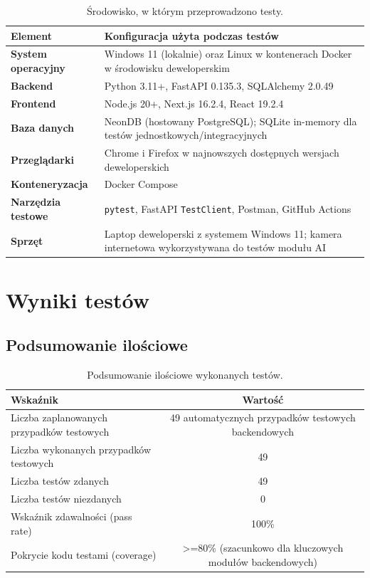 \documentclass[11pt,a4paper]{article}
\begin{document}
\begin{table}[h]
\centering
\begin{tabularx}{\textwidth}{>{\bfseries}p{3.5cm} Y}
\toprule
\textbf{Element} & \textbf{Konfiguracja użyta podczas testów} \\
\midrule
System operacyjny & Windows 11 (lokalnie) oraz Linux w kontenerach Docker w środowisku deweloperskim \\
Backend & Python 3.11+, FastAPI 0.135.3, SQLAlchemy 2.0.49 \\
Frontend & Node.js 20+, Next.js 16.2.4, React 19.2.4 \\
Baza danych & NeonDB (hostowany PostgreSQL); SQLite in-memory dla testów jednostkowych/integracyjnych \\
Przeglądarki & Chrome i Firefox w najnowszych dostępnych wersjach deweloperskich \\
Konteneryzacja & Docker Compose \\
Narzędzia testowe & \texttt{pytest}, FastAPI \texttt{TestClient}, Postman, GitHub Actions \\
Sprzęt & Laptop deweloperski z systemem Windows 11; kamera internetowa wykorzystywana do testów modułu AI \\
\bottomrule
\end{tabularx}
\caption{Środowisko, w którym przeprowadzono testy.}
\end{table}

\section{Wyniki testów}

\subsection{Podsumowanie ilościowe}
\begin{table}[h]
\centering
\begin{tabularx}{\textwidth}{Y c}
\toprule
\textbf{Wskaźnik} & \textbf{Wartość} \\
\midrule
Liczba zaplanowanych przypadków testowych & 49 automatycznych przypadków testowych backendowych \\
Liczba wykonanych przypadków testowych & 49 \\
Liczba testów zdanych & 49 \\
Liczba testów niezdanych & 0 \\
Wskaźnik zdawalności (pass rate) & 100\% \\
Pokrycie kodu testami (coverage) & \textgreater=80\% (szacunkowo dla kluczowych modułów backendowych) \\
\bottomrule
\end{tabularx}
\caption{Podsumowanie ilościowe wykonanych testów.}
\end{table}
\end{document}
